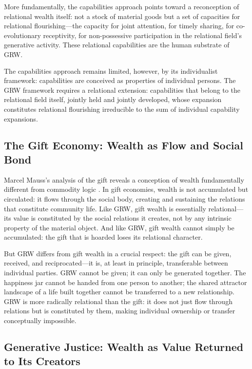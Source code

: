More fundamentally, the capabilities approach points toward a reconception of relational wealth itself: not a stock of material goods but a set of capacities for relational flourishing---the capacity for joint attention, for timely sharing, for co-evolutionary receptivity, for non-possessive participation in the relational field's generative activity. These relational capabilities are the human substrate of GRW.

The capabilities approach remains limited, however, by its individualist framework: capabilities are conceived as properties of individual persons. The GRW framework requires a relational extension: capabilities that belong to the relational field itself, jointly held and jointly developed, whose expansion constitutes relational flourishing irreducible to the sum of individual capability expansions.

\subsection{The Gift Economy: Wealth as Flow and Social Bond}
\label{p15:subsec:gift}

\noindent
Marcel Mauss's analysis of the gift reveals a conception of wealth fundamentally different from commodity logic \parencite{mauss1990}. In gift economies, wealth is not accumulated but circulated: it flows through the social body, creating and sustaining the relations that constitute community life. Like GRW, gift wealth is essentially relational---its value is constituted by the social relations it creates, not by any intrinsic property of the material object. And like GRW, gift wealth cannot simply be accumulated: the gift that is hoarded loses its relational character.

But GRW differs from gift wealth in a crucial respect: the gift can be given, received, and reciprocated---it is, at least in principle, transferable between individual parties. GRW cannot be given; it can only be generated together. The happiness jar cannot be handed from one person to another; the shared attractor landscape of a life built together cannot be transferred to a new relationship. GRW is more radically relational than the gift: it does not just flow through relations but is constituted by them, making individual ownership or transfer conceptually impossible.

\subsection{Generative Justice: Wealth as Value Returned to Its Creators}
\label{p15:subsec:generative_justice}

